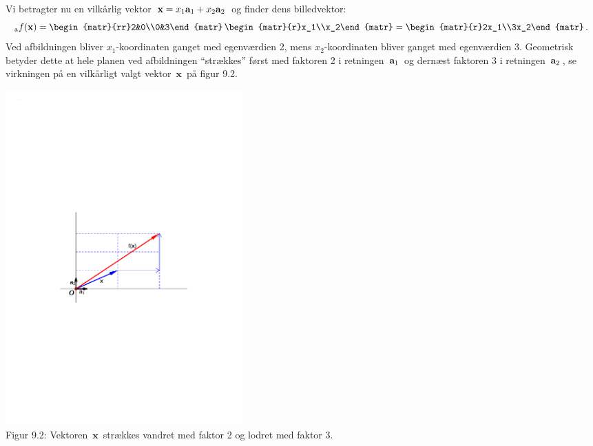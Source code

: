 \begin{example}
Vi betragter nu en vilkårlig vektor $\,\mathbf x=x_1\mathbf{a}_1+x_2\mathbf{a}_2\,$ og finder dens billedvektor: 
\begin{equation*}
_\mathrm{a}f(\mathbf x)=\begin{matr}{rr}2&0\\0&3\end{matr}\,\begin{matr}{r}x_1\\x_2\end{matr}=\begin{matr}{r}2x_1\\3x_2\end{matr}\,.
\end{equation*}
Ved afbildningen bliver $x_1$-koordinaten ganget med egenværdien 2, mens $x_2$-koordinaten bliver ganget med egenværdien 3. Geo\-metrisk betyder dette at hele planen ved afbildningen ``strækkes'' først med faktoren 2 i retningen $\,\mathbf{a}_1\,$ og dernæst faktoren 3 i retningen $\,\mathbf{a}_2\,$, se virkningen på en vilkårligt valgt vektor $\,\mathbf x \,$ på figur 9.2.

\begin{center}
\includegraphics[trim=4.5cm 10.5cm 4.5cm 10.5cm,width=0.40\textwidth,clip]{diagMatrix.pdf} \\
Figur 9.2: Vektoren $\,\mathbf x\,$ strækkes vandret med faktor 2 og lodret med faktor 3.
\end{center}


\end{example}
